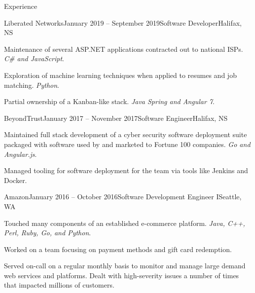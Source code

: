\documentclass{resume} %
\begin{document}
\begin{rSection}{Experience}

\begin{rSubsection}{Liberated Networks}{January 2019 -- September 2019}{Software Developer}{Halifax, NS}
\item Maintenance of several ASP.NET applications contracted out to national ISPs. \textit{C\# and JavaScript}.
\item Exploration of machine learning techniques when applied to resumes and job matching. \textit{Python}.
\item Partial ownership of a Kanban-like stack. \textit{Java Spring and Angular 7}.
\end{rSubsection}

\begin{rSubsection}{BeyondTrust}{January 2017 -- November 2017}{Software Engineer}{Halifax, NS}
\item Maintained full stack development of a cyber security software deployment suite packaged with software used by and marketed to Fortune 100 companies. \textit{Go and Angular.js}.
\item Managed tooling for software deployment for the team via tools like Jenkins and Docker.  
\end{rSubsection}


\begin{rSubsection}{Amazon}{January 2016 -- October 2016}{Software Development Engineer I}{Seattle, WA}
\item Touched many components of an established e-commerce platform. \textit{Java, C++, Perl, Ruby, Go, and Python}.
\item Worked on a team focusing on payment methods and gift card redemption.
\item Served on-call on a regular monthly basis to monitor and manage large demand web services and platforms. Dealt with high-severity issues a number of times that impacted millions of customers.
\end{rSubsection}

\end{rSection}

\end{document}
